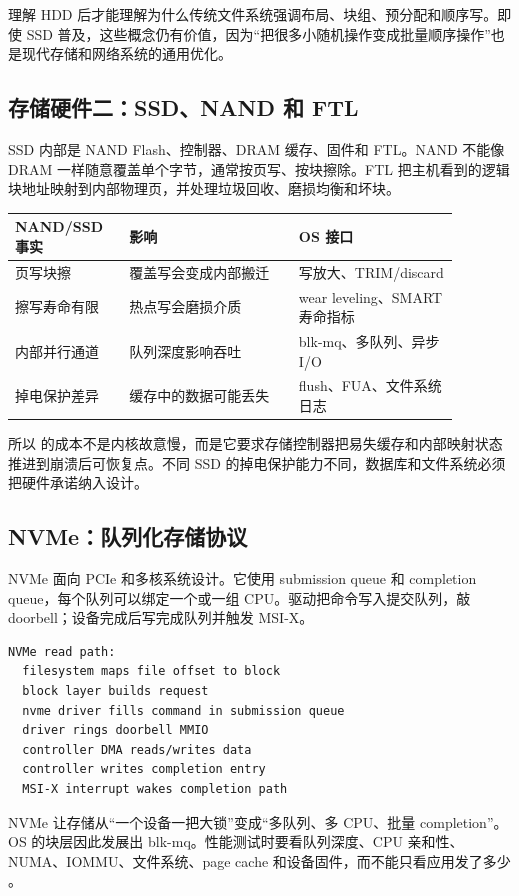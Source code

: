 理解 HDD 后才能理解为什么传统文件系统强调布局、块组、预分配和顺序写。即使 SSD 普及，这些概念仍有价值，因为“把很多小随机操作变成批量顺序操作”也是现代存储和网络系统的通用优化。

\subsection{存储硬件二：SSD、NAND 和 FTL}

SSD 内部是 NAND Flash、控制器、DRAM 缓存、固件和 FTL。NAND 不能像 DRAM 一样随意覆盖单个字节，通常按页写、按块擦除。FTL 把主机看到的逻辑块地址映射到内部物理页，并处理垃圾回收、磨损均衡和坏块。

\begin{longtable}{p{0.22\linewidth}p{0.34\linewidth}p{0.32\linewidth}}
\toprule
NAND/SSD 事实 & 影响 & OS 接口 \\
\midrule
页写块擦 & 覆盖写会变成内部搬迁 & 写放大、TRIM/discard \\
擦写寿命有限 & 热点写会磨损介质 & wear leveling、SMART 寿命指标 \\
内部并行通道 & 队列深度影响吞吐 & blk-mq、多队列、异步 I/O \\
掉电保护差异 & 缓存中的数据可能丢失 & flush、FUA、文件系统日志 \\
\bottomrule
\end{longtable}

所以  的成本不是内核故意慢，而是它要求存储控制器把易失缓存和内部映射状态推进到崩溃后可恢复点。不同 SSD 的掉电保护能力不同，数据库和文件系统必须把硬件承诺纳入设计。

\subsection{NVMe：队列化存储协议}

NVMe 面向 PCIe 和多核系统设计。它使用 submission queue 和 completion queue，每个队列可以绑定一个或一组 CPU。驱动把命令写入提交队列，敲 doorbell；设备完成后写完成队列并触发 MSI-X。

\begin{lstlisting}
NVMe read path:
  filesystem maps file offset to block
  block layer builds request
  nvme driver fills command in submission queue
  driver rings doorbell MMIO
  controller DMA reads/writes data
  controller writes completion entry
  MSI-X interrupt wakes completion path
\end{lstlisting}

NVMe 让存储从“一个设备一把大锁”变成“多队列、多 CPU、批量 completion”。OS 的块层因此发展出 blk-mq。性能测试时要看队列深度、CPU 亲和性、NUMA、IOMMU、文件系统、page cache 和设备固件，而不能只看应用发了多少 。

